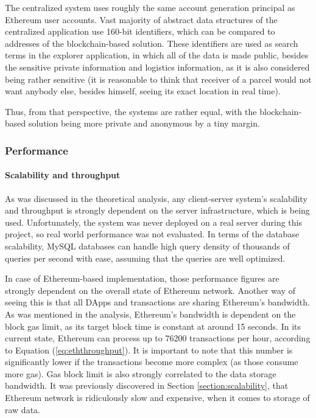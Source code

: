 The centralized system uses roughly the same account generation principal as Ethereum user accounts. Vast majority of abstract data structures of the centralized application use 160-bit identifiers, which can be compared to addresses of the blockchain-based solution. These identifiers are used as search terms in the explorer application, in which all of the data is made public, besides the sensitive private information and logistics information, as it is also considered being rather sensitive (it is reasonable to think that receiver of a parcel would not want anybody else, besides himself, seeing its exact location in real time).

Thus, from that perspective, the systems are rather equal, with the blockchain-based solution being more private and anonymous by a tiny margin.

\subsubsection{Performance} \label{section:performancepractical}

\paragraph{Scalability and throughput}
As was discussed in the theoretical analysis, any client-server system's scalability and throughput is strongly dependent on the server infrastructure, which is being used. Unfortunately, the system was never deployed on a real server during this project, so real world performance was not evaluated. In terms of the database scalability, MySQL databases can handle high query density of thousands of queries per second with ease, assuming that the queries are well optimized.

In case of Ethereum-based implementation, those performance figures are strongly dependent on the overall state of Ethereum network. Another way of seeing this is that all DApps and transactions are sharing Ethereum's bandwidth. As was mentioned in the analysis, Ethereum's bandwidth is dependent on the block gas limit, as its target block time is constant at around 15 seconds. In its current state, Ethereum can process up to 76200 transactions per hour, according to Equation (\ref{eq:eththroughput}). It is important to note that this number is significantly lower if the transactions become more complex (as those consume more gas). Gas block limit is also strongly correlated to the data storage bandwidth. It was previously discovered in Section \ref{section:scalability}, that Ethereum network is ridiculously slow and expensive, when it comes to storage of raw data.

